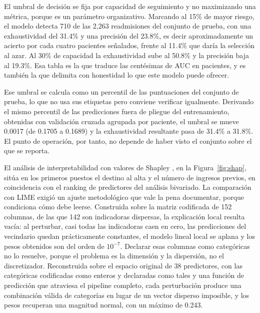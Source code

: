 \documentclass[pdflatex,sn-mathphys-num]{sn-jnl}
\begin{document}
El umbral de decisión se fija por capacidad de seguimiento y no maximizando una métrica, porque es un parámetro organizativo. Marcando al 15\% de mayor riesgo, el modelo detecta 710 de las 2{,}263 readmisiones del conjunto de prueba, con una exhaustividad del 31.4\% y una precisión del 23.8\%, es decir aproximadamente un acierto por cada cuatro pacientes señalados, frente al 11.4\% que daría la selección al azar. Al 30\% de capacidad la exhaustividad sube al 50.8\% y la precisión baja al 19.3\%. Esa tabla es la que traduce las centésimas de AUC en pacientes, y es también la que delimita con honestidad lo que este modelo puede ofrecer.

Ese umbral se calcula como un percentil de las puntuaciones del conjunto de prueba, lo que no usa sus etiquetas pero conviene verificar igualmente. Derivando el mismo percentil de las predicciones fuera de pliegue del entrenamiento, obtenidas con validación cruzada agrupada por paciente, el umbral se mueve 0.0017 (de 0.1705 a 0.1689) y la exhaustividad resultante pasa de 31.4\% a 31.8\%. El punto de operación, por tanto, no depende de haber visto el conjunto sobre el que se reporta.

El análisis de interpretabilidad con valores de Shapley \cite{bib_lundberg}, en la Figura~\ref{fig:shap}, sitúa en los primeros puestos el destino al alta y el número de ingresos previos, en coincidencia con el ranking de predictores del análisis bivariado. La comparación con LIME \cite{bib_ribeiro} exigió un ajuste metodológico que vale la pena documentar, porque condiciona cómo debe leerse. Construida sobre la matriz codificada de 152 columnas, de las que 142 son indicadoras dispersas, la explicación local resulta vacía: al perturbar, casi todas las indicadoras caen en cero, las predicciones del vecindario quedan prácticamente constantes, el modelo lineal local se aplana y los pesos obtenidos son del orden de $10^{-7}$. Declarar esas columnas como categóricas no lo resuelve, porque el problema es la dimensión y la dispersión, no el discretizador. Reconstruida sobre el espacio original de 38 predictores, con las categóricas codificadas como enteros y declaradas como tales y una función de predicción que atraviesa el pipeline completo, cada perturbación produce una combinación válida de categorías en lugar de un vector disperso imposible, y los pesos recuperan una magnitud normal, con un máximo de 0.243.
\end{document}
